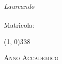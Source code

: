 \begin{titlepage}
\begin{center}
\begin{large}
            \begin{flushright}
                \textit{Laureando}\\
                \vspace{5pt}
                \myName \\
                \vspace{5pt}
                Matricola: \myMatricola
            \end{flushright}
        \end{large}

        \vspace{40pt}

        \line(1, 0){338} \\
        \begin{normalsize}
            \textsc{Anno Accademico \myAA}
        \end{normalsize}
    \end{center}
\end{titlepage}
